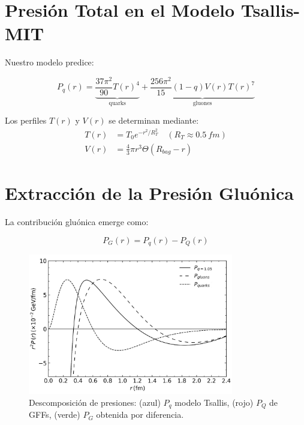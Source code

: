 \section{Presión Total en el Modelo Tsallis-MIT}
Nuestro modelo predice:

\begin{equation}
P_q(r) = \underbrace{\frac{37\pi^2}{90}T(r)^4}_{\text{quarks}} + \underbrace{\frac{256\pi^2}{15}(1-q)V(r)T(r)^7}_{\text{gluones}}
\end{equation}

\begin{remark}
Los perfiles $T(r)$ y $V(r)$ se determinan mediante:
\begin{align}
T(r) &= T_0 e^{-r^2/R_T^2} \quad (R_T \approx \qty{0.5}{fm}) \\
V(r) &= \frac{4}{3}\pi r^3 \Theta(R_{bag} - r)
\end{align}
\end{remark}

\section{Extracción de la Presión Gluónica}
La contribución gluónica emerge como:

\begin{equation}
P_G(r) = P_q(r) - P_Q(r)
\end{equation}

\begin{figure}[h]
    \centering
    \includegraphics[width=0.8\textwidth]{./Images/PressureDistributionsTot-Q-G.png}
    \caption{Descomposición de presiones: (azul) $P_q$ modelo Tsallis, (rojo) $P_Q$ de GFFs, (verde) $P_G$ obtenida por diferencia.}
    \label{fig:PressureDecomp}
\end{figure}

